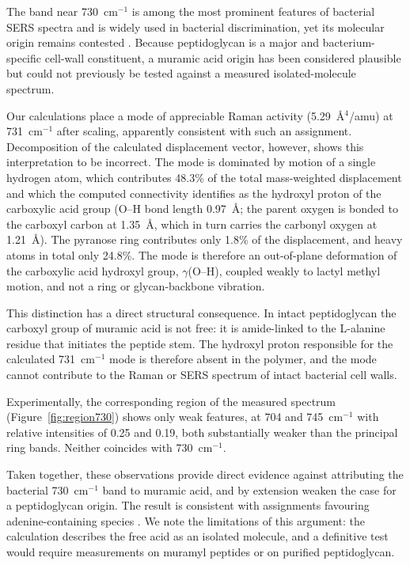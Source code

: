 \documentclass[11pt,a4paper]{article}
\newcommand{\wn}{\ensuremath{\mathrm{cm}^{-1}}}
\begin{document}
The band near 730~\wn{} is among the most prominent features of bacterial
SERS spectra and is widely used in bacterial discrimination, yet its
molecular origin remains contested
\cite{premasiri2016origins,kubryk2016origin}. Because peptidoglycan is a
major and bacterium-specific cell-wall constituent, a muramic acid origin has
been considered plausible but could not previously be tested against a
measured isolated-molecule spectrum.

Our calculations place a mode of appreciable Raman activity
(5.29~\AA$^4$/amu) at 731~\wn{} after scaling, apparently consistent with
such an assignment. Decomposition of the calculated displacement vector,
however, shows this interpretation to be incorrect. The mode is dominated by
motion of a single hydrogen atom, which contributes 48.3\% of the total
mass-weighted displacement and which the computed connectivity identifies as
the hydroxyl proton of the carboxylic acid group (O--H bond length 0.97~\AA;
the parent oxygen is bonded to the carboxyl carbon at 1.35~\AA, which in turn
carries the carbonyl oxygen at 1.21~\AA). The pyranose ring contributes only
1.8\% of the displacement, and heavy atoms in total only 24.8\%. The mode is
therefore an out-of-plane deformation of the carboxylic acid hydroxyl group,
$\gamma$(O--H), coupled weakly to lactyl methyl motion, and not a ring or
glycan-backbone vibration.

This distinction has a direct structural consequence. In intact
peptidoglycan the carboxyl group of muramic acid is not free: it is
amide-linked to the L-alanine residue that initiates the peptide stem. The
hydroxyl proton responsible for the calculated 731~\wn{} mode is therefore
absent in the polymer, and the mode cannot contribute to the Raman or SERS
spectrum of intact bacterial cell walls.

Experimentally, the corresponding region of the measured spectrum
(Figure~\ref{fig:region730}) shows only weak features, at 704 and 745~\wn{}
with relative intensities of 0.25 and 0.19, both substantially weaker than
the principal ring bands. Neither coincides with 730~\wn{}.

Taken together, these observations provide direct evidence against
attributing the bacterial 730~\wn{} band to muramic acid, and by extension
weaken the case for a peptidoglycan origin. The result is consistent with
assignments favouring adenine-containing species
\cite{premasiri2016origins,kubryk2016origin}. We note the limitations of this
argument: the calculation describes the free acid as an isolated molecule,
and a definitive test would require measurements on muramyl peptides or on
purified peptidoglycan.
\end{document}
